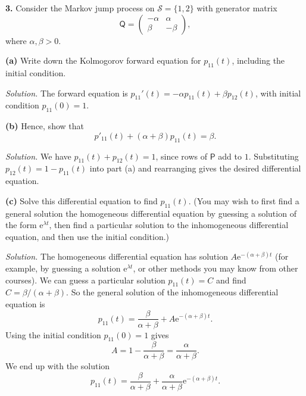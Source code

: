 \documentclass[
  a4paper,
]{article}
\theoremstyle{definition}
\theoremstyle{definition}
\theoremstyle{definition}
\theoremstyle{remark}
\begin{document}
\textbf{3.} Consider the Markov jump process on \(\mathcal S = \{1,2\}\) with generator matrix
\[ \mathsf Q = \begin{pmatrix} -\alpha & \alpha \\ \beta & -\beta \end{pmatrix} , \]
where \(\alpha, \beta > 0\).

\textbf{(a)} Write down the Kolmogorov forward equation for \(p_{11}(t)\), including the initial condition.

\begin{myanswers}
\emph{Solution.}
The forward equation is \(p_{11}'(t) = -\alpha p_{11}(t) + \beta p_{12}(t)\), with initial condition \(p_{11}(0) = 1\).

\end{myanswers}

\textbf{(b)} Hence, show that
\[ p'_{11}(t) + (\alpha + \beta)p_{11}(t) = \beta .  \]

\begin{myanswers}
\emph{Solution.}
We have \(p_{11}(t) + p_{12}(t) = 1\), since rows of \(\mathsf P\) add to \(1\). Substituting \(p_{12}(t) = 1 - p_{11}(t)\) into part (a) and rearranging gives the desired differential equation.

\end{myanswers}

\textbf{(c)} Solve this differential equation to find \(p_{11}(t)\). (You may wish to first find a general solution the homogeneous differential equation by guessing a solution of the form \(\mathrm{e}^{\lambda t}\), then find a particular solution to the inhomogeneous differential equation, and then use the initial condition.)

\begin{myanswers}
\emph{Solution.}
The homogeneous differential equation has solution \(A \mathrm e^{-(\alpha + \beta)t}\) (for example, by guessing a solution \(\mathrm e^{\lambda t}\), or other methods you may know from other courses). We can guess a particular solution \(p_{11}(t) = C\) and find \(C = \beta/(\alpha + \beta)\). So the general solution of the inhomogeneous differential equation is
\[ p_{11}(t) = \frac{\beta}{\alpha+\beta} + A \mathrm e^{-(\alpha + \beta)t} . \]
Using the initial condition \(p_{11}(0) = 1\) gives
\[ A = 1-\frac{\beta}{\alpha + \beta} = \frac{\alpha}{\alpha + \beta} . \]
We end up with the solution
\[ p_{11}(t) = \frac{\beta}{\alpha + \beta} + \frac{\alpha}{\alpha + \beta} \mathrm e^{-(\alpha + \beta)t} . \]

\end{myanswers}
\end{document}
